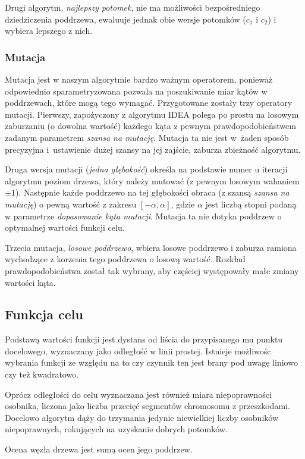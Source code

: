 \documentclass[11pt, leqno]{article}
\renewcommand{\i}[1]{\textit{#1}}
\begin{document}
Drugi algorytm, \i{najlepszy potomek}, nie ma możliwości bezpośredniego dziedziczenia poddrzewa, ewaluuje jednak obie wersje potomków ($c_1$ i $c_2$) i wybiera lepszego z nich.

\subsubsection{Mutacja}
Mutacja jest w naszym algorytmie bardzo ważnym operatorem, ponieważ odpowiednio sparametryzowana pozwala na poszukiwanie miar kątów w poddrzewach, które mogą tego wymagać. Przygotowane zostały trzy operatory mutacji. Pierwszy, zapożyczony z algorytmu IDEA polega po prostu na losowym zaburzaniu (o dowolna wartość) każdego kąta z pewnym prawdopodobieństwem zadanym parametrem \i{szansa na mutację}. Mutacja ta nie jest w~żaden sposób precyzyjna i~ustawienie dużej szansy na jej zajście, zaburza zbieżność algorytmu.

Druga wersja mutacji (\i{jedna głębokość}) określa na podstawie numer u iteracji algorytmu poziom drzewa, który należy mutować (z pewnym losowym wahaniem $\pm 1$). Następnie każde poddrzewo na tej głębokości obraca (z szansą \i{szansa na mutację}) o pewną wartość z zakresu $[-\alpha, \alpha]$, gdzie $\alpha$ jest liczbą stopni podaną w parametrze \i{dopasowanie kąta mutacji}. Mutacja ta nie dotyka poddrzew o optymalnej wartości funkcji celu.

Trzecia mutacja, \i{losowe poddrzewo}, wbiera losowe poddrzewo i zaburza ramiona wychodzące z korzenia tego poddrzewa o losową wartość. Rozkład prawdopodobieństwa został tak wybrany, aby częściej występowały małe zmiany wartości kąta.

\subsection{Funkcja celu}
Podstawą wartości funkcji jest dystans od liścia do przypisanego mu punktu docelowego, wyznaczany jako odległość w linii prostej. Istnieje możliwośc wybrania funkcji ze względu na to czy czynnik ten jest brany pod uwagę liniowo czy też kwadratowo.

Oprócz odległości do celu wyznaczana jest również miara niepoprawności osobnika, liczona jako liczba przecięć segmentów chromosomu z przeszkodami. Docelowo algorytm dąży do trzymania jedynie niewielkiej liczby osobników niepoprawnych, rokujących na uzyskanie dobrych potomków.

Ocena węzła drzewa jest sumą ocen jego poddrzew. 
\end{document}
